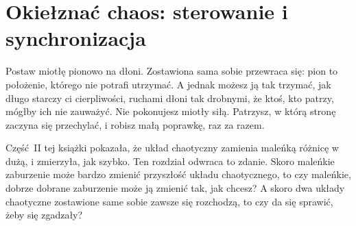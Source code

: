 
\chapter{Okiełznać chaos: sterowanie i synchronizacja}
\label{ch:taming}

\noindent
Postaw miotłę pionowo na dłoni. Zostawiona sama sobie przewraca się: pion to
położenie, którego nie potrafi utrzymać. A jednak możesz ją tak trzymać, jak
długo starczy ci cierpliwości, ruchami dłoni tak drobnymi, że ktoś, kto
patrzy, mógłby ich nie zauważyć. Nie pokonujesz miotły siłą. Patrzysz, w
którą stronę zaczyna się przechylać, i robisz małą poprawkę, raz za razem.

Część~II tej książki pokazała, że układ chaotyczny zamienia maleńką różnicę w
dużą, i zmierzyła, jak szybko. Ten rozdział odwraca to zdanie. Skoro
maleńkie zaburzenie może bardzo zmienić przyszłość układu chaotycznego, to
czy maleńkie, dobrze dobrane zaburzenie może ją zmienić tak, jak chcesz? A
skoro dwa układy chaotyczne zostawione same sobie zawsze się rozchodzą, to
czy da się sprawić, żeby się zgadzały?

\begin{outcomes}
\end{outcomes}

